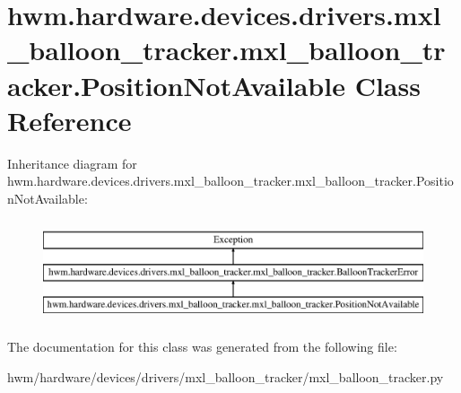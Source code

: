 \hypertarget{classhwm_1_1hardware_1_1devices_1_1drivers_1_1mxl__balloon__tracker_1_1mxl__balloon__tracker_1_1_position_not_available}{\section{hwm.\-hardware.\-devices.\-drivers.\-mxl\-\_\-balloon\-\_\-tracker.\-mxl\-\_\-balloon\-\_\-tracker.\-Position\-Not\-Available Class Reference}
\label{classhwm_1_1hardware_1_1devices_1_1drivers_1_1mxl__balloon__tracker_1_1mxl__balloon__tracker_1_1_position_not_available}
}
Inheritance diagram for hwm.\-hardware.\-devices.\-drivers.\-mxl\-\_\-balloon\-\_\-tracker.\-mxl\-\_\-balloon\-\_\-tracker.\-Position\-Not\-Available\-:\begin{figure}[H]
\begin{center}
\leavevmode
\includegraphics[height=3.000000cm]{classhwm_1_1hardware_1_1devices_1_1drivers_1_1mxl__balloon__tracker_1_1mxl__balloon__tracker_1_1_position_not_available}
\end{center}
\end{figure}


The documentation for this class was generated from the following file\-:\begin{DoxyCompactItemize}
\item 
hwm/hardware/devices/drivers/mxl\-\_\-balloon\-\_\-tracker/mxl\-\_\-balloon\-\_\-tracker.\-py\end{DoxyCompactItemize}
